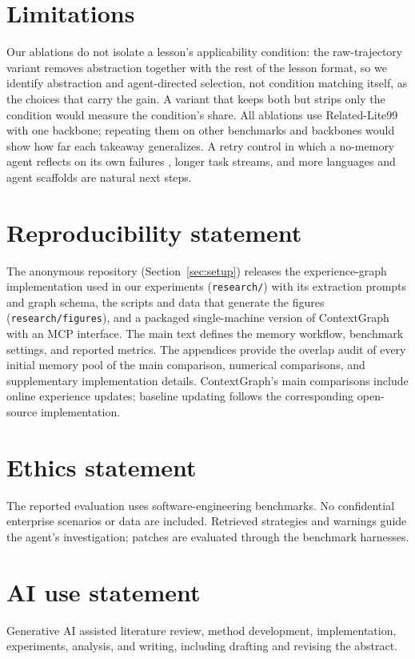 \documentclass{article}
\begin{document}
\clearpage


\clearpage
\appendix

\clearpage

\clearpage

\clearpage

\clearpage

\clearpage

\section*{Limitations}
Our ablations do not isolate a lesson's applicability condition: the
raw-trajectory variant removes abstraction together with the rest of the
lesson format, so we identify abstraction and agent-directed selection, not
condition matching itself, as the choices that carry the gain. A variant that
keeps both but strips only the condition would measure the condition's share.
All ablations use Related-Lite99 with one backbone; repeating them on other
benchmarks and backbones would show how far each takeaway generalizes.
A retry control in which a no-memory agent reflects on its own failures
\citep{reflexion2023}, longer task streams, and more languages and agent
scaffolds are natural next steps.

\section*{Reproducibility statement}
The anonymous repository (Section~\ref{sec:setup}) releases the
experience-graph implementation used in our experiments
(\texttt{research/}) with its extraction prompts and graph schema, the
scripts and data that generate the figures (\texttt{research/figures}), and
a packaged single-machine version of ContextGraph with an MCP interface.
The main text defines the memory workflow, benchmark settings, and reported
metrics. The appendices provide the overlap audit of every initial memory
pool of the main comparison, numerical comparisons, and supplementary
implementation details.
ContextGraph's main comparisons include online experience updates; baseline
updating follows the corresponding open-source implementation.
\section*{Ethics statement}
The reported evaluation uses software-engineering benchmarks. No confidential
enterprise scenarios or data are included. Retrieved strategies and warnings
guide the agent's investigation; patches are evaluated through the benchmark
harnesses.
\section*{AI use statement}
Generative AI assisted literature review, method development, implementation,
experiments, analysis, and writing, including drafting and revising the abstract.
\end{document}
